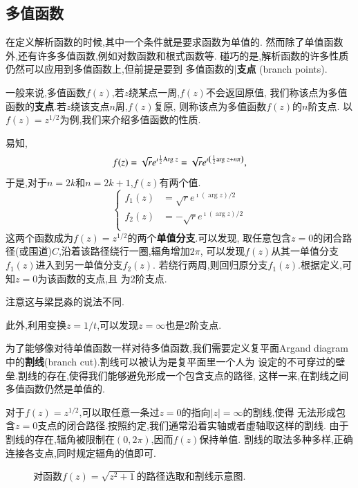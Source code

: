 \subsection{多值函数}
在定义解析函数的时候,其中一个条件就是要求函数为单值的.
然而除了单值函数外,还有许多多值函数,例如对数函数和根式函数等.
碰巧的是,解析函数的许多性质仍然可以应用到多值函数上,但前提是要到
多值函数的|\textbf{支点}  (branch points).

一般来说,多值函数$f(z)$,若$z$绕某点一周,$f(z)$不会返回原值,
我们称该点为多值函数的\textbf{支点}.若$z$绕该支点$n$周,$f(z)$复原,
则称该点为多值函数$f(z)$的$n$阶支点.
以$f(z) = z^{1/2}$为例,我们来介绍多值函数的性质.

易知,\[
    f(z) = \sqrt{r} e^{\imath {\frac{1}{2}}  {\mathrm{Arg}\;} z}
    =  \sqrt{r} e^{\imath \left( {\frac{1}{2}} {\mathrm{arg}\;} z + n \pi \right)},
    \]
于是,对于$n= 2k$和$n=2k+1$,$f(z)$有两个值.
\begin{equation}
    \left\{\begin{aligned}
    f_1(z) & =\sqrt{r}  e^{\imath(\arg z) / 2} \\
    f_2(z) & =-\sqrt{r}  e^{\imath(\arg z) / 2} \\
    \end{aligned}\right.
\end{equation}
这两个函数成为$f(z)= z^{1/2}$的两个\textbf{单值分支}.可以发现,
取任意包含$z=0$的闭合路径(或围道)$C$,沿着该路径绕行一圈,辐角增加$2\pi$,
可以发现$f(z)$从其一单值分支$f_1(z)$进入到另一单值分支$f_2(z)$.
若绕行两周,则回归原分支$f_1(z)$.根据定义,可知$z=0$为该函数的支点,且
为2阶支点.
\begin{note}
注意这与梁昆淼的说法不同.
\end{note}

此外,利用变换$z=1/t$,可以发现$z=\infty$也是2阶支点.

为了能够像对待单值函数一样对待多值函数,我们需要定义复平面Argand diagram
中的\textbf{割线}(branch cut).割线可以被认为是复平面里一个人为
设定的不可穿过的壁垒.割线的存在,使得我们能够避免形成一个包含支点的路径,
这样一来,在割线之间多值函数仍然是单值的.

对于$f(z)=z^{1/2}$,可以取任意一条过$z=0$的指向$|z|=\infty$的割线,使得
无法形成包含$z=0$支点的闭合路径.按照约定,我们通常沿着实轴或者虚轴取这样的割线.
由于割线的存在,辐角被限制在$(0,2\pi)$,因而$f(z)$保持单值.
割线的取法多种多样,正确连接各支点,同时规定辐角的值即可.

\begin{figure}[htbp]
    \centering
    
    \caption{对函数$f(z) = \sqrt{z^2 + 1}$的路径选取和割线示意图.}
    \label{fig:contours}
\end{figure}

